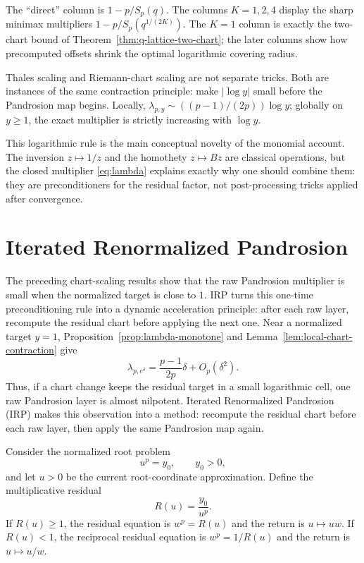 \documentclass[10pt,a4paper]{article}
\theoremstyle{plain}
\theoremstyle{definition}
\theoremstyle{remark}
\newenvironment{takeaway}{%
  \begin{center}\begin{minipage}{0.92\linewidth}\small\itshape\color{blue!45!black}%
}{%
  \end{minipage}\end{center}%
}
\begin{document}
The ``direct'' column is $1-p/S_p(q)$.  The columns $K=1,2,4$ display the
sharp minimax multipliers $1-p/S_p(q^{1/(2K)})$.  The $K=1$ column is exactly
the two-chart bound of Theorem~\ref{thm:q-lattice-two-chart}; the later columns
show how precomputed offsets shrink the optimal logarithmic covering radius.


\begin{takeaway}
Thales scaling and Riemann-chart scaling are not separate tricks.  Both are
instances of the same contraction principle: make $|\log y|$ small before the
Pandrosion map begins.  Locally,
$\lambda_{p,y}\sim ((p-1)/(2p))\log y$; globally on $y\ge1$, the exact
multiplier is strictly increasing with $\log y$.
\end{takeaway}

This logarithmic rule is the main conceptual novelty of the monomial account.
The inversion $z\mapsto1/z$ and the homothety $z\mapsto Bz$ are classical
operations, but the closed multiplier \eqref{eq:lambda} explains exactly why
one should combine them: they are preconditioners for the residual factor, not
post-processing tricks applied after convergence.

\section{Iterated Renormalized Pandrosion}
\label{sec:irp}

The preceding chart-scaling results show that the raw Pandrosion multiplier
is small when the normalized target is close to $1$.  IRP turns this
one-time preconditioning rule into a dynamic acceleration principle: after each
raw layer, recompute the residual chart before applying the next one.  Near a
normalized target $y=1$, Proposition~\ref{prop:lambda-monotone} and
Lemma~\ref{lem:local-chart-contraction} give
\[
  \lambda_{p,e^\delta}=\frac{p-1}{2p}\delta+O_p(\delta^2).
\]
Thus, if a chart change keeps the residual target in a small logarithmic cell,
one raw Pandrosion layer is almost nilpotent.  Iterated Renormalized Pandrosion
(IRP) makes this observation into a method: recompute the residual chart before
each raw layer, then apply the same Pandrosion map again.

Consider the normalized root problem
\[
  u^p=y_0,
  \qquad y_0>0,
\]
and let $u>0$ be the current root-coordinate approximation.  Define the
multiplicative residual
\[
  R(u)=\frac{y_0}{u^p}.
\]
If $R(u)\ge1$, the residual equation is $w^p=R(u)$ and the return is
$u\mapsto u w$.  If $R(u)<1$, the reciprocal residual equation is
$w^p=1/R(u)$ and the return is $u\mapsto u/w$.
\end{document}
